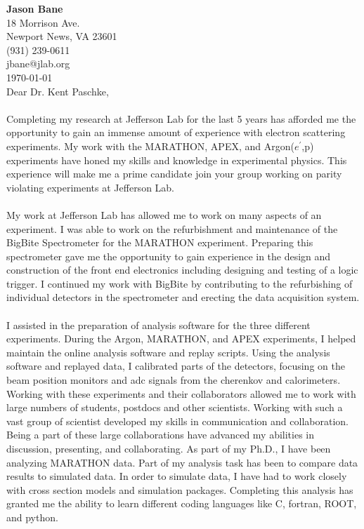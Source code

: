 \documentclass[12pt,letterpaper]{article}
\newcommand{\CPP}
{C\nolinebreak[4]\hspace{-.05em}\raisebox{.22ex}{\footnotesize\bf ++}}
\begin{document}
\vspace*{-1.2cm}
{\textbf{Jason Bane}}\\
18 Morrison Ave. \\
Newport News, VA 23601 \\
(931) 239-0611 \\
jbane@jlab.org \\
\today\\

Dear Dr. Kent Paschke, 

\paragraph{}Completing my research at Jefferson Lab for the last 5 years has afforded me the opportunity to gain an immense amount of experience with electron scattering experiments. My work with the MARATHON, APEX, and Argon($e^\prime$,p) experiments have honed my skills and knowledge in experimental physics. This experience will make me a prime candidate join your group working on parity violating experiments at Jefferson Lab.
\paragraph{}My work at Jefferson Lab has allowed me to work on many aspects of an experiment. I was able to work on the refurbishment and maintenance of the BigBite Spectrometer for the MARATHON experiment. Preparing this spectrometer gave me the opportunity to gain experience in the design and construction of the front end electronics including designing and testing of a logic trigger. I continued my work with BigBite by contributing to the refurbishing of individual detectors in the spectrometer and erecting the data acquisition system.
\paragraph{}I assisted in the preparation of analysis software for the three different experiments. During the Argon, MARATHON, and APEX experiments, I helped maintain the online analysis software and replay scripts. Using the analysis software and replayed data, I calibrated parts of the detectors, focusing on the beam position monitors and adc signals from the cherenkov and calorimeters. Working with these experiments and their collaborators allowed me to work with large numbers of students, postdocs and other scientists.  Working with such a vast group of scientist developed my skills in communication and collaboration. Being a part of these large collaborations have advanced my abilities in discussion, presenting, and collaborating.
As part of my Ph.D., I have been analyzing MARATHON data. Part of my analysis task has been to compare data results to simulated data. In order to simulate data, I have had to work closely with cross section models and simulation packages. Completing this analysis has granted me the ability to learn different coding languages like \CPP, fortran, ROOT, and python. 
\end{document}
